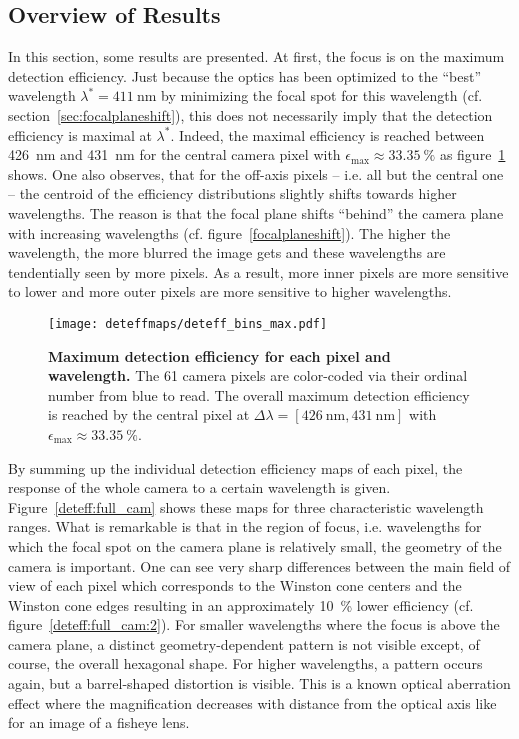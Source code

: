 \subsection{Overview of Results}

In this section, some results are presented. At first, the focus is on the maximum detection efficiency. Just because the optics has been optimized to the \enquote{best} wavelength $\lambda^\ast=\SI{411}{\nano\meter}$ by minimizing the focal spot for this wavelength (cf. section~\ref{sec:focalplaneshift}), this does not necessarily imply that the detection efficiency is maximal at $\lambda^\ast$. Indeed, the maximal efficiency is reached between \SI{426}{\nano\meter} and \SI{431}{\nano\meter} for the central camera pixel with $\epsilon_\text{max}\approx\SI{33.35}{\percent}$ as figure~\ref{max_deteff} shows. One also observes, that for the off-axis pixels -- i.e. all but the central one -- the centroid of the efficiency distributions slightly shifts towards higher wavelengths. The reason is that the focal plane shifts \enquote{behind} the camera plane with increasing wavelengths (cf. figure~\ref{focalplaneshift}). The higher the wavelength, the more blurred the image gets and these wavelengths are tendentially seen by more pixels. As a result, more inner pixels are more sensitive to lower and more outer pixels are more sensitive to higher wavelengths.\\

\begin{figure}[H]
	\centering
	\texttt{[image: deteffmaps/deteff\_bins\_max.pdf]}
	\caption[Maximum detection efficiency for each pixel and wavelength]{\textbf{Maximum detection efficiency for each pixel and wavelength.} The 61 camera pixels are color-coded via their ordinal number from blue to read. The overall maximum detection efficiency is reached by the central pixel at $\Delta\lambda=[\SI{426}{\nano\meter},\SI{431}{\nano\meter}]$ with $\epsilon_\text{max}\approx\SI{33.35}{\percent}$.}
	\label{max_deteff}
\end{figure}

By summing up the individual detection efficiency maps of each pixel, the response of the whole camera to a certain wavelength is given. Figure~\ref{deteff:full_cam} shows these maps for three characteristic wavelength ranges. What is remarkable is that in the region of focus, i.e. wavelengths for which the focal spot on the camera plane is relatively small, the geometry of the camera is important. One can see very sharp differences between the main field of view of each pixel which corresponds to the Winston cone centers and the Winston cone edges resulting in an approximately \SI{10}{\percent} lower efficiency (cf. figure~\ref{deteff:full_cam:2}). For smaller wavelengths where the focus is above the camera plane, a distinct geometry-dependent pattern is not visible except, of course, the overall hexagonal shape. For higher wavelengths, a pattern occurs again, but a barrel-shaped distortion is visible. This is a known optical aberration effect where the magnification decreases with distance from the optical axis like for an image of a fisheye lens.\\

